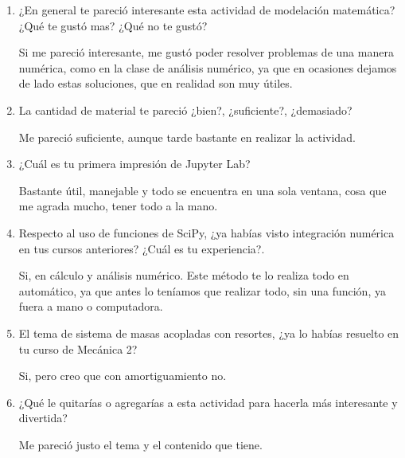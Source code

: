 \documentclass[12pt]{article}
\begin{document}
\begin{enumerate}
\item ¿En general te pareció interesante esta actividad de modelación matemática? ¿Qué te gustó mas? ¿Qué no te gustó?

Si me pareció interesante, me gustó poder resolver problemas de una manera numérica, como en la clase de análisis numérico, ya que en ocasiones dejamos de lado estas soluciones, que en realidad son muy útiles.

\item La cantidad de material te pareció ¿bien?, ¿suficiente?, ¿demasiado?

Me pareció suficiente, aunque tarde bastante en realizar la actividad.

\item ¿Cuál es tu primera impresión de Jupyter Lab? 

Bastante útil, manejable y todo se encuentra en una sola ventana, cosa que me agrada mucho, tener todo a la mano.

\item Respecto al uso de funciones de SciPy, ¿ya habías visto integración numérica en tus cursos anteriores? ¿Cuál es tu experiencia?.

Si, en cálculo y análisis numérico. Este método te lo realiza todo en automático, ya que antes lo teníamos que realizar todo, sin una función, ya fuera a mano o computadora.

\item El tema de sistema de masas acopladas con resortes, ¿ya lo habías resuelto en tu curso de Mecánica 2?  

Si, pero creo que con amortiguamiento no.

\item ¿Qué le quitarías o agregarías a esta actividad para hacerla más interesante y divertida?

Me pareció justo el tema y el contenido que tiene. 

\end{enumerate}
\end{document}
